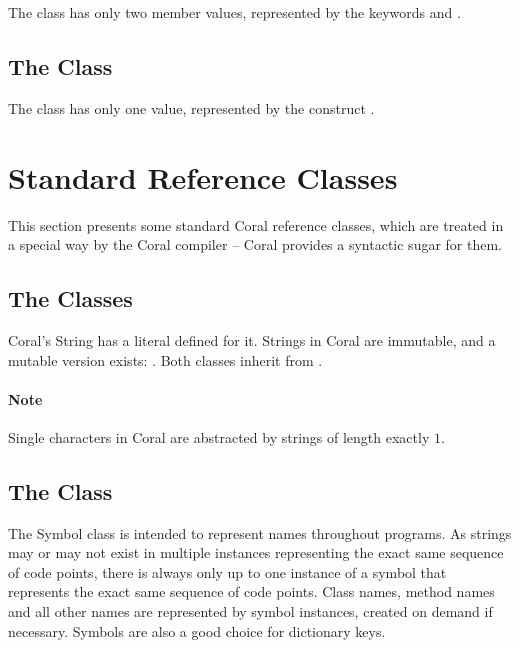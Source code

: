 The  class has only two member values, represented by the keywords  and . 





\subsection{The  Class}

The  class has only one value, represented by the construct \code{()}. 





\section{Standard Reference Classes}

This section presents some standard Coral reference classes, which are treated in a special way by the Coral compiler -- Coral provides a syntactic sugar for them. 




\subsection{The  Classes}

Coral's String has a literal defined for it. Strings in Coral are immutable, and a mutable version exists: . Both classes inherit from . 

\paragraph{Note}
Single characters in Coral are abstracted by strings of length exactly $1$. 

\subsection{The  Class}


The Symbol class is intended to represent names throughout programs. As strings may or may not exist in multiple instances representing the exact same sequence of code points, there is always only up to one instance of a symbol that represents the exact same sequence of code points. Class names, method names and all other names are represented by symbol instances, created on demand if necessary. Symbols are also a good choice for dictionary keys. 





